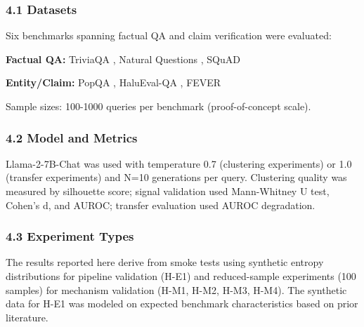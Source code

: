 
\subsubsection{4.1 Datasets}

Six benchmarks spanning factual QA and claim verification were evaluated:

\textbf{Factual QA:} TriviaQA \citep{joshi2017triviaqa}, Natural Questions \citep{kwiatkowski2019natural}, SQuAD \citep{rajpurkar2016squad}

\textbf{Entity/Claim:} PopQA \citep{mallen2023popqa}, HaluEval-QA \citep{li2023halueval}, FEVER \citep{thorne2018fever}

Sample sizes: 100-1000 queries per benchmark (proof-of-concept scale).

\subsubsection{4.2 Model and Metrics}

Llama-2-7B-Chat was used with temperature 0.7 (clustering experiments) or 1.0 (transfer experiments) and N=10 generations per query. Clustering quality was measured by silhouette score; signal validation used Mann-Whitney U test, Cohen's d, and AUROC; transfer evaluation used AUROC degradation.

\subsubsection{4.3 Experiment Types}

The results reported here derive from smoke tests using synthetic entropy distributions for pipeline validation (H-E1) and reduced-sample experiments (100 samples) for mechanism validation (H-M1, H-M2, H-M3, H-M4). The synthetic data for H-E1 was modeled on expected benchmark characteristics based on prior literature.

